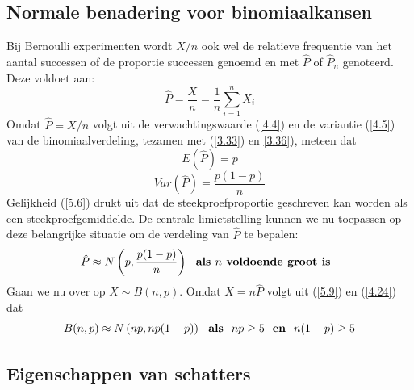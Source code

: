 \documentclass[titlepage]{article}
\numberwithin{equation}{section}
\begin{document}
\subsection{Normale benadering voor binomiaalkansen}
Bij Bernoulli experimenten wordt $X/n$ ook wel de relatieve frequentie van het aantal successen of de proportie successen genoemd en met $\hat{P}$ of $\hat{P}_n$ genoteerd. Deze voldoet aan:
\begin{equation}
	\hat{P} = \frac{X}{n} = \frac{1}{n}\sum\limits_{i=1}^n X_i
	\label{5.6}
\end{equation}
Omdat $\hat{P} = X/n$ volgt uit de verwachtingswaarde (\ref{4.4}) en de variantie (\ref{4.5}) van de binomiaalverdeling, tezamen met (\ref{3.33}) en \ref{3.36}), meteen dat
\begin{equation}
	E(\hat{P}) = p
	\label{5.7}
\end{equation}
\begin{equation}
	Var(\hat{P}) = \frac{p(1-p)}{n}
	\label{5.8}
\end{equation}
Gelijkheid (\ref{5.6}) drukt uit dat de steekproefproportie geschreven kan worden als een steekproefgemiddelde. De centrale limietstelling kunnen we nu toepassen op deze belangrijke situatie om de verdeling van $\hat{P}$ te bepalen:
\begin{equation}
	\hat{P}\approx N \left(p, \frac{p(1-p)}{n}\right) \text{ \textbf{ als $n$ voldoende groot is } }
	\label{5.9}
\end{equation}
Gaan we nu over op $X \sim B(n,p)$. Omdat $X = n\hat{P}$ volgt uit (\ref{5.9}) en (\ref{4.24}) dat
\begin{equation}
	B(n,p) \approx N\left(np, np(1-p)\right) \text{ \textbf{ als } } np \geq 5 \text{ \textbf{ en } } n(1-p) \geq 5
	\label{5.10}
\end{equation}
\subsection{Eigenschappen van schatters}
\end{document}
